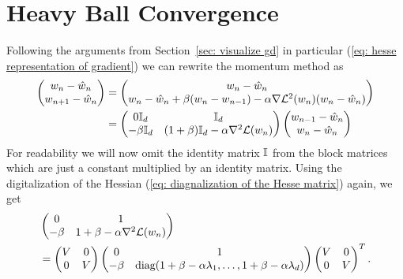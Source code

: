 \section{Heavy Ball Convergence}\label{sec: heavy ball convergence}

Following the arguments from Section~\ref{sec: visualize gd} in particular
(\ref{eq: hesse representation of gradient}) we can rewrite the momentum
method as
\begin{align*}
	\begin{pmatrix}
		w_n - \hat{w}_n \\
		w_{n+1} - \hat{w}_n
	\end{pmatrix}
	&=
	\begin{pmatrix}
		w_n - \hat{w}_n \\
		w_n - \hat{w}_n + \beta (w_n - w_{n-1})
		- \alpha \nabla\mathcal{L}^2(w_n)(w_n -\hat{w}_n)
	\end{pmatrix}\\
	&=
	\begin{pmatrix}
		0\mathbb{I}_d & \mathbb{I}_d \\
		-\beta\mathbb{I}_d
		& (1+\beta)\mathbb{I}_d -\alpha \nabla^2\mathcal{L}(w_n)
	\end{pmatrix}
	\begin{pmatrix}
		w_{n-1} - \hat{w}_n \\
		w_n - \hat{w}_n
	\end{pmatrix}
\end{align*}
%
For readability we will now omit the identity matrix \(\mathbb{I}\) from the
block matrices which are just a constant multiplied by an identity matrix.
Using the digitalization of the Hessian (\ref{eq: diagnalization of the
Hesse matrix}) again, we get
%
\begin{align*}
	&\begin{pmatrix}
		0 & 1 \\
		-\beta & 1+\beta -\alpha \nabla^2\mathcal{L}(w_n)
	\end{pmatrix}\\
	&=
	\begin{pmatrix}
		V & 0 \\
		0 & V
	\end{pmatrix}	
	\begin{pmatrix}
		0 & 1 \\
		-\beta &
		\text{diag}(1+\beta -\alpha\lambda_1, \dots, 
		1+\beta -\alpha\lambda_d)
	\end{pmatrix}
	\begin{pmatrix}
		V & 0 \\
		0 & V
	\end{pmatrix}^T.
\end{align*}
